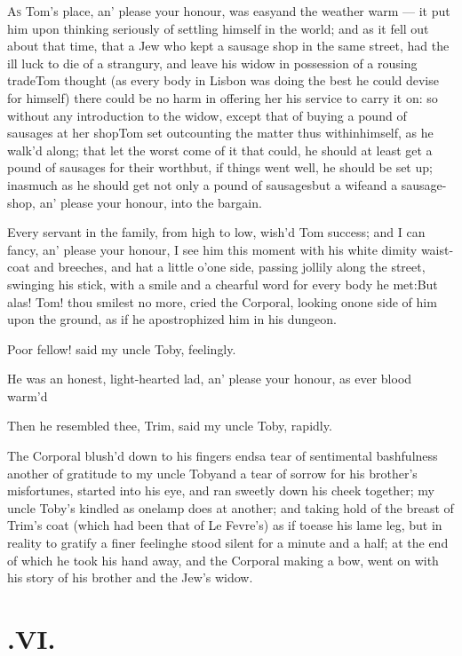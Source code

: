 \documentclass{article}
\begin{document}
\lettrine{A}{s} Tom’s place, an’ please your honour, was easy\tsk and the weather warm
— it put him upon thinking seriously of settling himself in the world; and as it
fell out about that time, that a Jew who kept a sausage shop in the same street, had
the ill luck to die of a strangury, and leave his widow in possession of a rousing
trade\tsh Tom thought (as every body in Lisbon was doing the best he could devise
for himself) there could be no harm in offering her his service to carry it on: so
without any introduction to the widow, except that of buying a pound of sausages at
her shop\tsk Tom set out\tsk counting the matter thus within\pb himself, as he walk’d
along; that let the worst come of it that could, he should at least get a pound of
sausages for their worth\tsk but, if things went well, he should be set up; inasmuch
as he should get not only a pound of sausages\tsk but a wife\tsk and a sausage-shop, an’
please your honour, into the bargain.

Every servant in the family, from high to low, wish’d Tom success; and I can fancy,
an’ please your honour, I see him this moment with his white dimity waist-coat and
breeches, and hat a little o’\thinspace one side, passing jollily along the street, swinging
his stick, with a smile and a chearful word for every body he met:\break\tsh But alas!
Tom!  thou smilest no more, cried the Corporal, looking on\pb one side of him upon the
ground, as if he apostrophized him in his dungeon.

Poor fellow! said my uncle Toby, feelingly.

He was an honest, light-hearted lad, an’ please your honour, as ever blood warm’d
\tsh

\tsh Then he resembled thee, Trim, said my uncle Toby, rapidly.

The Corporal blush’d down to his fingers ends\tsk a tear of sentimental bashfulness
\tsk another of gratitude to my uncle Toby\tsk and a tear of sorrow for his
brother’s misfortunes, started into his eye, and ran sweetly down his cheek
together; my uncle Toby’s kindled as one\pb lamp does at another; and taking hold of
the breast of Trim’s coat (which had been that of Le Fevre’s) as if to\break ease
his lame leg, but in reality to gratify a finer feeling\tsh he stood silent for\break
a minute and a half; at the end of which he took his hand away, and the Corporal
making a bow, went on with his story of his brother and the Jew’s widow.

\newpage
\section{.\enspace VI.}
\end{document}
